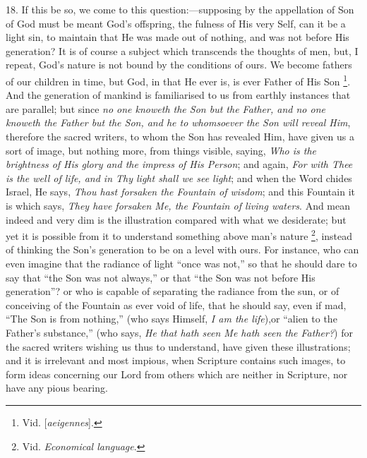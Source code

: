 18. If this be so, we come to
this question:—supposing by the appellation of Son of God must be
meant God's offspring, the fulness of His very Self, can it be a light
sin, to maintain that He was made out of nothing, and was not before
His generation? It is of course a subject which transcends the
thoughts of men, but, I repeat, God's nature is not bound by the
conditions of ours. We become fathers of our children in time, but
God, in that He ever is, is ever Father of His Son \footnote{Vid. [\emph{aeigennes}].}. And the generation of mankind is familiarised to us from
earthly instances that are parallel; but since \emph{no one knoweth the
Son but the Father, and no one knoweth the Father but the Son, and he
to whomsoever the Son will reveal Him}, therefore the sacred
writers, to whom the Son has revealed Him, have given us a sort of
image, but nothing more, from things visible, saying, \emph{Who is the
brightness of His glory and the impress of His Person}; and again, \emph{For
with Thee is the well of life, and in Thy light shall we see light};
and when the Word chides Israel, He says, \emph{Thou hast forsaken the
Fountain of wisdom}; and this Fountain it is which says, \emph{They
have forsaken Me, the Fountain of living waters}. And mean indeed
and very dim is the illustration compared with what we desiderate; but
yet it is possible from it to understand something above man's nature
\footnote{Vid. \emph{Economical language}.}, instead of thinking
the Son's generation to be on a level with ours. For instance, who can
even imagine that the radiance of light ``once was not,'' so that he
should dare to say that ``the Son was not always,'' or that ``the Son was
not before His generation''? or who is capable of separating the
radiance from the sun, or of conceiving of the Fountain as ever void
of life, that he should say, even if mad, ``The Son is from nothing,''
(who says Himself, \emph{I am the life}),\emph{}or ``alien to the
Father's substance,'' (who says, \emph{He that hath seen Me hath seen the
Father?}) for the sacred writers wishing us thus to understand,
have given these illustrations; and it is irrelevant and most impious,
when Scripture contains such images, to form ideas concerning our Lord
from others which are neither in Scripture, nor have any pious
bearing.

